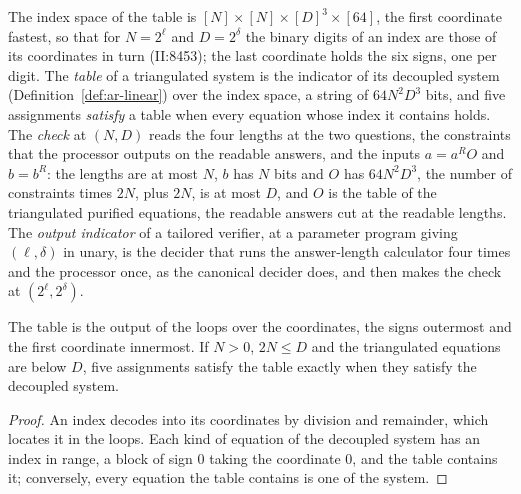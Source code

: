 \begin{definition}
\label{def:ar-indicator}
\leanok
The index space of the table is $[N] \times [N] \times [D]^3 \times [64]$, the first coordinate
fastest, so that for $N = 2^\ell$ and $D = 2^{\delta}$ the binary digits of an index are those of
its coordinates in turn (II:8453); the last coordinate holds the six signs, one per digit. The
\emph{table} of a triangulated system is the indicator of its decoupled system
(Definition~\ref{def:ar-linear}) over the index space, a string of $64 N^2 D^3$ bits, and five
assignments \emph{satisfy} a table when every equation whose index it contains holds. The
\emph{check} at $(N, D)$ reads the four lengths at the two questions, the constraints that the
processor outputs on the readable answers, and the inputs $a = a^R O$ and $b = b^R$: the lengths
are at most $N$, $b$ has $N$ bits and $O$ has $64 N^2 D^3$, the number of constraints times $2N$,
plus $2N$, is at most $D$, and $O$ is the table of the triangulated purified equations, the
readable answers cut at the readable lengths. The \emph{output indicator} of a tailored verifier,
at a parameter program giving $(\ell, \delta)$ in unary, is the decider that runs the
answer-length calculator four times and the processor once, as the canonical decider does, and
then makes the check at $(2^\ell, 2^{\delta})$.
\end{definition}

\begin{lemma}
\label{lem:ar-indicator-table}
\leanok
The table is the output of the loops over the coordinates, the signs outermost and the first
coordinate innermost. If $N > 0$, $2N \le D$ and the triangulated equations are below $D$, five
assignments satisfy the table exactly when they satisfy the decoupled system.
\end{lemma}

\begin{proof}
\leanok
An index decodes into its coordinates by division and remainder, which locates it in the loops.
Each kind of equation of the decoupled system has an index in range, a block of sign $0$ taking
the coordinate $0$, and the table contains it; conversely, every equation the table contains is
one of the system.
\end{proof}

